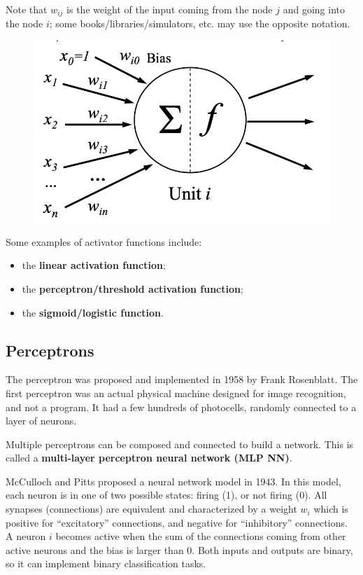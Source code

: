 Note that $w_{ij}$ is the weight of the input coming from the node $j$ and going into the node $i$; some books/libraries/simulators, etc. may use the opposite notation.

\begin{figure}[ht]
    \centering
    \includegraphics[width=0.5\linewidth]{img/Neuron.png}
\end{figure}

Some examples of activator functions include:

\begin{itemize}
    \item the \textbf{linear activation function};
    \item the \textbf{perceptron/threshold activation function};
    \item the \textbf{sigmoid/logistic function}.
\end{itemize}

\subsection{Perceptrons}

The perceptron was proposed and implemented in 1958 by Frank Rosenblatt. The first perceptron was an actual physical machine designed for image recognition, and not a program. It had a few hundreds of photocells, randomly connected to a layer of neurons.

Multiple perceptrons can be composed and connected to build a network. This is called a \textbf{multi-layer perceptron neural network (MLP NN)}. 

McCulloch and Pitts proposed a neural network model in 1943. In this model, each neuron is in one of two possible states: firing (1), or not firing (0). All synapses (connections) are equivalent and characterized by a weight $w_i$ which is positive for ``excitatory'' connections, and negative for ``inhibitory'' connections. A neuron $i$ becomes active when the sum of the connections coming from other active neurons and the bias is larger than 0. Both inputs and outputs are binary, so it can implement binary classification tasks.

